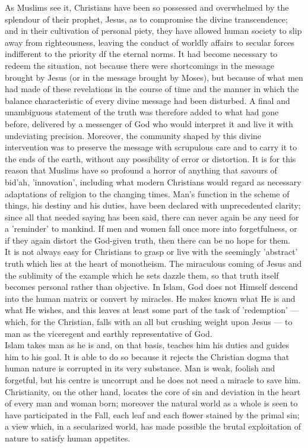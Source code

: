 \documentclass[11pt, b5paper, twoside]{book}
\begin{document}
As Muslims see it, Christians have been so possessed and overwhelmed by the splendour of their 
prophet, Jesus, as to compromise the divine transcendence; and in their cultivation of personal 
piety, they have allowed human society to slip away from righteousness, leaving the conduct of 
worldly affairs to secular forces indifferent to the priority df the eternal norms. It had become 
necessary to redeem the situation, not because there were shortcomings in the message brought by 
Jesus (or in the message brought by Moses), but because of what men had made of these revelations in 
the course of time and the manner in which the balance characteristic of every divine message had 
been disturbed. A final and unambiguous statement of the truth was therefore added to what had gone 
before, delivered by a messenger of God who would interpret it and live it with undeviating 
precision. Moreover, the community shaped by this divine intervention was to preserve the message 
with scrupulous care and to carry it to the ends of the earth, without any possibility of error or 
distortion. It is for this reason that Muslims have so profound a horror of anything that savours of 
bid'ah, 'innovation', including what modern Christians would regard as necessary adaptations of 
religion to the changing times. Man's function in the scheme of things, his destiny and his duties, 
have been declared with unprecedented clarity; since all that needed saying has been said, there can 
never again be any need for a 'reminder' to mankind. If men and women fall once more into 
forgetfulness, or if they again distort the God-given truth, then there can be no hope for them. \\

It is not always easy for Christians to grasp or live with the seemingly 'abstract' truth which lies 
at the heart of monotheism. The miraculous coming of Jesus and the sublimity of the example which he 
sets dazzle them, so that truth itself becomes personal rather than objective. In Islam, God does not 
Himself descend into the human matrix or convert by miracles. He makes known what He is and what He 
wishes, and this leaves at least some part of the task of 'redemption' --- which, for the Christian, 
falls with an all but crushing weight upon Jesus --- to man as the viceregent and earthly 
representative of God. \\

Islam takes man as he is and, on that basis, teaches him his duties and guides him to his goal. It is 
able to do so because it rejects the Christian dogma that human nature is corrupted in its very 
substance. Man is weak, foolish and forgetful, but his centre is uncorrupt and he does not need a 
miracle to save him. Christianity, on the other hand, locates the core of sin and deviation in the 
heart of every man and woman born; moreover the natural world as a whole is seen to have participated 
in the Fall, each leaf and each flower stained by the primal sin; a view which, in a secularized 
world, has made possible the brutal exploitation of nature to satisfy human appetites. \\
\end{document}
